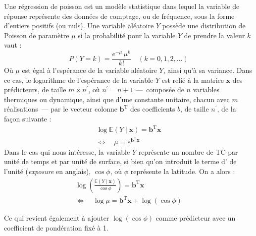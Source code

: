 \documentclass[../main.tex]{subfiles}
\begin{document}
Une régression de poisson est un modèle statistique dans lequel la variable de réponse représente des données de comptage, ou de fréquence, sous la forme
d'entiers positifs (ou nuls). Une variable aléatoire $Y$ possède une distribution de Poisson de paramètre $\mu$ si la probabilité pour la variable $Y$
de prendre la valeur $k$ vaut :
%
\begin{equation*}
    P(Y = k) = \frac{e^{-\mu} \, \mu^k}{k!} \quad (k=0, 1, 2, \ldots) 
\end{equation*}
%
Où $\mu$ est égal à l'espérance de la variable aléatoire $Y$, ainsi qu'à sa variance. Dans ce cas, le logarithme de l'espérance de la variable $Y$ est relié
à la matrice $\mathbf{x}$ des prédicteurs, de taille $m \times n^\prime$, où $n^\prime = n + 1$ ---~composée de $n$ variables thermiques ou dynamique, ainsi que
d'une constante unitaire, chacun avec $m$ réalisations~--- par le vecteur colonne $\mathbf{b}^{\mathrm{T}}$ des coefficients $b$, de taille $n^\prime$, de la
façon suivante :
%
\begin{gather*}
    \log \mathbb{E} \left( Y \mid \mathbf{x} \right ) = \mathbf{b}^{\mathrm{T}} \mathbf{x} \\
    \Leftrightarrow \quad \mu = e^{\mathbf{b}^{\mathrm{T}} \mathbf{x}}
\end{gather*}
%
Dans le cas qui nous intéresse, la variable $Y$ représente un nombre de TC par unité de temps et par unité de surface, si bien qu'on introduit le terme
d' de l'unité (\textit{exposure} en anglais), $\cos \phi$, où $\phi$ représente la latitude. On a alors :
%
\begin{equation}
    \begin{gathered}\label{eq:poisson_reg}
        \log \left( \frac{\mathbb{E} \left( Y \mid \mathbf{x}\right )}{\cos \phi} \right) = \mathbf{b}^{\mathrm{T}} \mathbf{x} \\
        \Leftrightarrow \quad \log \mu = \mathbf{b}^{\mathrm{T}} \mathbf{x} + \log (\cos \phi)
    \end{gathered}
\end{equation}

%
Ce qui revient également à ajouter $\log (\cos \phi)$ comme prédicteur avec un coefficient de pondération fixé à 1.
\end{document}
